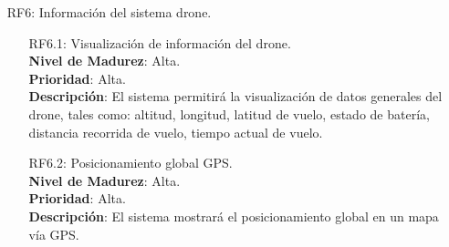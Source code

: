 \begin{itemize}
\begin{itemize}
	\end{itemize}
	\item[RF6:] Información del sistema drone. 
	\begin{itemize}
		\item[RF6.1:] Visualización de información del drone. \\
			\textbf{Nivel de Madurez}: Alta. \\
			\textbf{Prioridad}: Alta. \\
			\textbf{Descripción}: El sistema permitirá la 
			visualización de datos generales del drone, tales como: 
			altitud, longitud, latitud de vuelo, estado de batería, 
			distancia recorrida de vuelo, tiempo actual de vuelo.
		\item[RF6.2:] Posicionamiento global GPS. \\
			\textbf{Nivel de Madurez}: Alta. \\
			\textbf{Prioridad}: Alta. \\
			\textbf{Descripción}: El sistema mostrará el 
			posicionamiento global en un mapa vía GPS.
	\end{itemize}
\end{itemize}

